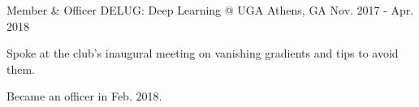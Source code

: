 \begin{cventries}

\cventry
{Member \& Officer}
{DELUG: Deep Learning @ UGA}
{Athens, GA}
{Nov. 2017 - Apr. 2018}
{\begin{cvitems}
    \item {Spoke at the club's inaugural meeting on vanishing gradients and tips to avoid them.}
    \item {Became an officer in Feb. 2018.}
\end{cvitems}}

\end{cventries}
